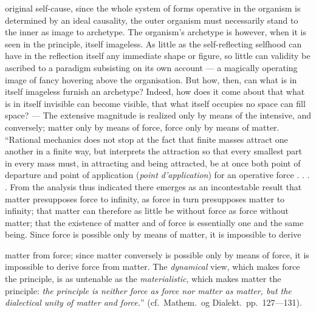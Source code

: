\documentclass[12pt,a4paper]{book}
\begin{document}
original self-cause, since the whole system of forms operative in the organism
is determined by an ideal causality, the outer organism must
necessarily stand to the inner as image to archetype. The organism's archetype
is
however, when it is seen in the principle, itself imageless. As little as the
self-reflecting selfhood can have in the reflection itself any immediate shape
or figure, so little can validity be ascribed to a paradigm subsisting on its
own account --- a magically operating image of fancy hovering above the
organisation. But how, then, can what is in itself imageless furnish an
archetype? Indeed, how does it come about that what is in itself invisible can
become visible, that what itself occupies no space can fill space? --- The
extensive magnitude is realized only by means of the intensive, and conversely;
matter only by means of force, force only by means of matter. ``Rational
mechanics does not stop at the fact that finite masses attract one another in a
finite way, but interprets the attraction so that every smallest part in every
mass must, in attracting and being attracted, be at once both point of
departure and point of application (\textit{point d'application}) for an
operative force . . . . From the analysis thus indicated there emerges as an
incontestable result that matter presupposes force to infinity, as force in
turn presupposes matter to infinity; that matter can therefore as little be
without force as force without matter; that the existence of matter and of
force is essentially one and the same being. Since force is possible only by
means of matter, it is impossible to derive

matter from force; since matter conversely is possible only by means of force,
it is impossible to derive force from matter. The \emph{dynamical} view, which
makes force the principle, is as untenable as the \emph{materialistic}, which
makes matter the principle: \emph{the principle is neither force as force nor
matter as matter, but the dialectical unity of matter and force.}'' (cf.\
Mathem.\ og Dialekt.\ pp.~127---131).
\end{document}
